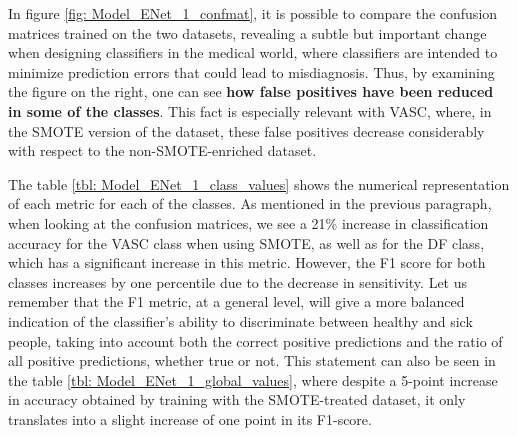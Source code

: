 In figure \ref{fig: Model_ENet_1_confmat}, it is possible to compare the confusion matrices trained on the two datasets, revealing a subtle but important change when designing classifiers in the medical world, where classifiers are intended to minimize prediction errors that could lead to misdiagnosis. Thus, by examining the figure on the right, one can see \textbf{how false positives have been reduced in some of the classes}. This fact is especially relevant with VASC, where, in the SMOTE version of the dataset, these false positives decrease considerably with respect to the non-SMOTE-enriched dataset.


\begin{table}[ht]
\centering
{}
    \caption{EffcientNet B0 Step 1. Metrics obtained by class.}
    \label{tbl: Model_ENet_1_class_values}
\end{table}

The table \ref{tbl: Model_ENet_1_class_values} shows the numerical representation of each metric for each of the classes. As mentioned in the previous paragraph, when looking at the confusion matrices, we see a 21\% increase in classification accuracy for the VASC class when using SMOTE, as well as for the DF class, which has a significant increase in this metric. However, the F1 score for both classes increases by one percentile due to the decrease in sensitivity.  Let us remember that the F1 metric, at a general level, will give a more balanced indication of the classifier's ability to discriminate between healthy and sick people, taking into account both the correct positive predictions and the ratio of all positive predictions, whether true or not. This statement can also be seen in the table \ref{tbl: Model_ENet_1_global_values}, where despite a 5-point increase in accuracy obtained by training with the SMOTE-treated dataset, it only translates into a slight increase of one point in its F1-score.

